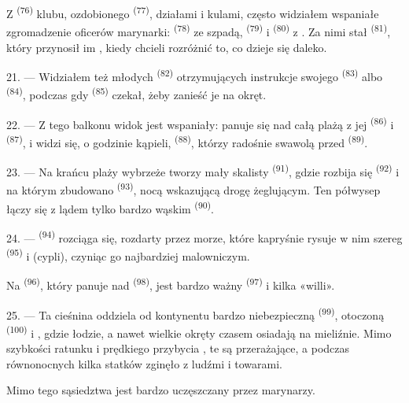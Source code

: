 Z  \textsuperscript{(76)} klubu, ozdobionego 
\textsuperscript{(77)}, działami i kulami, często widziałem wspaniałe zgromadzenie
oficerów marynarki:  \textsuperscript{(78)} ze szpadą,
 \textsuperscript{(79)} i 
\textsuperscript{(80)} z . Za nimi stał 
\textsuperscript{(81)}, który przynosił im , kiedy chcieli rozróżnić to,
co dzieje się daleko.

21. --- Widziałem też młodych  \textsuperscript{(82)}
otrzymujących instrukcje swojego  \textsuperscript{(83)} albo
 \textsuperscript{(84)}, podczas gdy 
\textsuperscript{(85)} czekał, żeby zanieść je na okręt.

22. --- Z tego balkonu widok jest wspaniały: panuje się nad całą plażą z jej
 \textsuperscript{(86)} i  \textsuperscript{(87)}, i
widzi się, o godzinie kąpieli,  \textsuperscript{(88)}, którzy
radośnie swawolą przed  \textsuperscript{(89)}.

23. --- Na krańcu plaży wybrzeże tworzy mały skalisty 
\textsuperscript{(91)}, gdzie rozbija się  \textsuperscript{(92)}
i na którym zbudowano  \textsuperscript{(93)}, nocą wskazującą
drogę żeglującym. Ten półwysep łączy się z lądem tylko bardzo wąskim 
\textsuperscript{(90)}.

\VUsaut{3.0mm}
\VUsaut{3.0mm}

24. ---  \textsuperscript{(94)} rozciąga się, rozdarty przez morze, które
kapryśnie rysuje w nim szereg  \textsuperscript{(95)} i
 (cypli), czyniąc go najbardziej malowniczym.

Na  \textsuperscript{(96)}, który panuje nad  \textsuperscript{(98)}, jest bardzo ważny  \textsuperscript{(97)}
i kilka «willi».

25. --- Ta cieśnina oddziela od kontynentu bardzo niebezpieczną 
\textsuperscript{(99)}, otoczoną  \textsuperscript{(100)} i
, gdzie łodzie, a nawet wielkie okręty czasem osiadają na mieliźnie.
Mimo szybkości ratunku i prędkiego przybycia , te
 są przerażające, a podczas  równonocnych
kilka statków zginęło z ludźmi i towarami.

Mimo tego sąsiedztwa  jest bardzo uczęszczany przez marynarzy.
\VUsaut{6.0mm}
\VUfilet{22mm}
